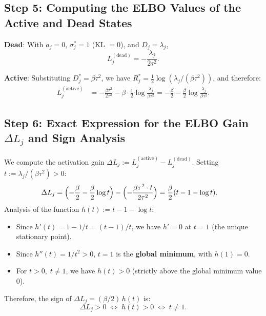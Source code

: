 \documentclass[make,article,submit,pdftex,moreauthors]{Definitions/mdpi}
\begin{document}
\subsection*{Step 5: Computing the ELBO Values of the Active and Dead States}

\textbf{Dead}: With $a_j = 0$, $\sigma_j^* = 1$ (KL $= 0$), and $D_j = \lambda_j$,
\begin{equation}
  L_j^{(\mathrm{dead})} = -\frac{\lambda_j}{2\tau^2}.
  \label{eq:Lj_dead}
\end{equation}

\textbf{Active}: Substituting $D_j^* = \beta\tau^2$, we have
$R_j^* = \tfrac{1}{2}\log(\lambda_j / (\beta\tau^2))$, and therefore:
\begin{align}
  L_j^{(\mathrm{active})}
  &= -\frac{\beta\tau^2}{2\tau^2} - \beta \cdot \frac{1}{2}\log\frac{\lambda_j}{\beta\tau^2}
   = -\frac{\beta}{2} - \frac{\beta}{2}\log\frac{\lambda_j}{\beta\tau^2}.
  \label{eq:Lj_active}
\end{align}

\subsection*{Step 6: Exact Expression for the ELBO Gain $\Delta L_j$ and Sign Analysis}

We compute the activation gain
$\Delta L_j := L_j^{(\mathrm{active})} - L_j^{(\mathrm{dead})}$.
Setting $t := \lambda_j / (\beta\tau^2) > 0$:
\begin{align}
  \Delta L_j
  &= \Bigl(-\frac{\beta}{2} - \frac{\beta}{2}\log t\Bigr) - \Bigl(-\frac{\beta\tau^2 \cdot t}{2\tau^2}\Bigr)
   = \frac{\beta}{2}(t - 1 - \log t).
  \label{eq:delta_L_exact}
\end{align}
Analysis of the function $h(t) := t - 1 - \log t$:
\begin{itemize}
  \item Since $h'(t) = 1 - 1/t = (t-1)/t$, we have $h' = 0$ at $t=1$ (the unique stationary point).
  \item Since $h''(t) = 1/t^2 > 0$, $t=1$ is the \textbf{global minimum}, with $h(1) = 0$.
  \item For $t > 0,\; t \neq 1$, we have $h(t) > 0$ (strictly above the global minimum value 0).
\end{itemize}
Therefore, the sign of $\Delta L_j = (\beta/2)\,h(t)$ is:
\begin{equation}
  \Delta L_j > 0
  \;\Longleftrightarrow\;
  h(t) > 0
  \;\Longleftrightarrow\;
  t \neq 1.
  \label{eq:delta_sign}
\end{equation}
\end{document}

